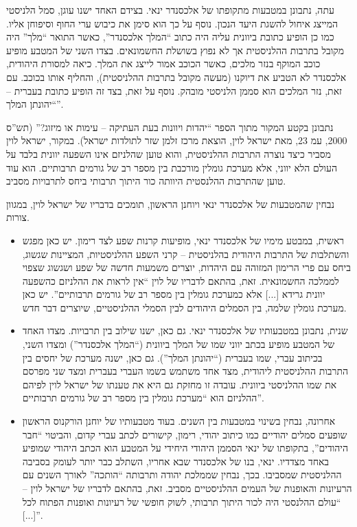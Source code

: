 \documentclass[]{article}
\newcommand\cb[1]   {\color{codeblue}#1\color{black}}
\begin{document}
\begin{enumerate}[A.]
        עתה, נתבונן במטבעות מתקופתו של אלכסנדר ינאי. בצידם האחד ישנו עוגן, סמל הלניסטי המייצג איחול להשגת היעד הנכון. נוסף על כך הוא סימן את כיבוש ערי החוף וסיפוחן אליו. כמו כן הופיע כתובת ביוונית עליה היה כתוב ``המלך אלכסנדר'', כאשר התואר ``מלך'' היה מקובל בתרבות ההלניסטית אך לא נפוץ בשושלת החשמונאים. בצדו השני של המטבע מופיע כוכב המוקף בנזר מלכים, כאשר הכוכב אמור לייצג את המלך. כיאה למסורת היהודית, אלכסנדר לא הטביע את דיוקנו (מעשה מקובל בתרבות ההלניסטית), והחליף אותו בכוכב. עם זאת, נזר המלכים הוא סממן הלניסטי מובהק. נוסף על זאת, בצד זה הופיע כתובת בעברית – ``יהונתן המלך''. 
        
        נתבונן בקטע המקור מתוך הספר ``יהדות ויוונות  בעת העתיקה – עימות או מיזוג?'' (תש''ס 2000, עמ 23, מאת ישראל לוין, הוצאת מרכז זלמן שזר לתולדות ישראל). במקור, ישראל לוין מסביר כיצד נוצרה התרבות ההלניסטית, והוא טוען שהלניזם אינו השפעה יוונית בלבד על העולם הלא יווני, אלא מערכת גומלין מורכבת בין מספר רב של גורמים תרבותיים. הוא עוד טוען שהתרבות ההלנסטית היוותה כור היתוך תרבותי ביחס לתרבויות מסביב. 
        
        נבחין שהמטבעות של אלכסנדר ינאי ויוחנן הראשון, תומכים בדבריו של ישראל לוין, במגוון צורות. 
        \begin{itemize}
            \item
             ראשית, במבטע מימיו של אלכסנדר ינאי, מופיעות קרנות שפע לצד רימון. יש כאן מפגש והשתלבות של התרבות היהודית בהלניסטית – \cb{קרני השפע ההלניסטיות, המציינות שגשוג, ביחס עם פרי הרימון המזוהה עם היהדות, יוצרים משמעות חדשה של שפע ושגשוג שצפוי לממלכה החשמונאית. }זאת, בהתאם לדבריו של לוין ``אין לראות את ההלניזם כהשפעה יוונית גרידא [...] אלא כמערכת גומלין בין מספר רב של גורמים תרבותיים''. יש כאן מערכת גומלין שלמה, בין הסמלים היהודים לבין הסמלי ההלניסטיים, שיוצרים דבר חדש. 
            \item
             שנית, נתבונן במטבעותיו של אלכסנדר ינאי. גם כאן, ישנו שילוב בין תרבויות. מצדו האחד של המטבע מופיע בכתב יווני שמו של המלך ביוונית (``המלך אלכסנדר'') ומצדו השני, בכיתוב עברי, שמו בעברית (``יהונתן המלך''). גם כאן, \cb{ישנה מערכת של יחסים בין התרבות ההלניסטית ליהודית, מצד אחד משתמש בשמו העברי בעברית ומצד שני מפרסם את שמו ההלניסטי ביוונית}. עובדה זו מחזקת גם היא את טענתו של ישראל לוין לפיהם ההלניזם הוא ``מערכת גומלין בין מספר רב של גורמים תרבותיים''. 
            \item
             אחרונה, נבחין בשינוי במטבעות בין השנים. בעוד מטבעותיו של יוחנן הורקנוס הראשון שופעים סמלים יהודיים כמו כיתוב יהודי, רימון, קישורים לכתב עברי קדום, והביטוי ``חבר היהודים'', בתקופתו של ינאי הסממן היהודי היחידי על המטבע הוא הכתב היהודי שמופיע באחד מצדדיו. ינאי, בנו של אלכסנדר שבא אחריו, השתלב כבר יותר לעומק בסביבה ההלניסטית שמסביבו. \cb{בכך, נבחין שממלכת יהודה ותרבותה ``הותכה'' לאורך השנים עם הרעיונות והאופנות של העמים ההלניסטיים מסביב}. זאת, בהתאם לדבריו של ישראל לוין – ``עולם ההלנסטי היה לכור היתוך תרבותי, לשוק חופשי של רעיונות ואופנות הפתוח לכל [...]''. 
        \end{itemize}
        

\end{enumerate}
\end{document}
